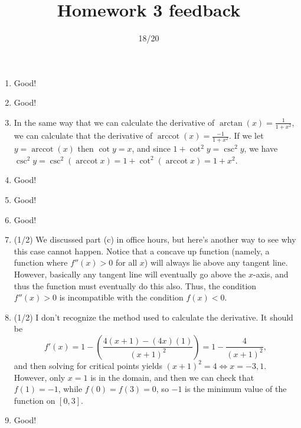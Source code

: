 \documentclass{article}
\title{Homework 3 feedback}
\author{18/20}
\date{}
\begin{document}
\maketitle
\begin{enumerate}
	\item Good!
	\item Good!
	\item In the same way that we can calculate the derivative of $\operatorname{arctan}(x) = \frac{1}{1+x^{2}}$, we can calculate that the derivative of $\operatorname{arccot}(x) = \frac{-1}{1+x^{2}}$. If we let $y = \operatorname{arccot}(x)$ then $\cot y = x$, and since $1 + \cot^{2} y = \csc^{2} y$, we have $\csc^{2} y = \csc^{2}(\operatorname{arccot} x) = 1 + \cot^{2} (\operatorname{arccot} x) = 1 + x^{2}$.
	\item Good!
	\item Good!
	\item Good! 
	\item (1/2) We discussed part (c) in office hours, but here's another way to see why this case cannot happen. Notice that a concave up function (namely, a function where $f''(x) > 0$ for all $x$) will always lie above any tangent line. However, basically any tangent line will eventually go above the $x$-axis, and thus the function must eventually do this also. Thus, the condition $f''(x) > 0$ is incompatible with the condition $f(x) < 0$.
	\item (1/2) I don't recognize the method used to calculate the derivative. It should be 
		\[
			f'(x) = 1 - \left( \frac{4 (x+1) - (4x)(1)}{(x+1)^{2}} \right) = 1 - \frac{4}{(x+1)^{2}},
		\]
		and then solving for critical points yields $(x+1)^{2} = 4 \Leftrightarrow x = -3, 1$. However, only $x=1$ is in the domain, and then we can check that $f(1) = -1$, while $f(0) = f(3) = 0$, so $-1$ is the minimum value of the function on $[0,3]$.
	\item Good!
\end{enumerate}
\end{document}
